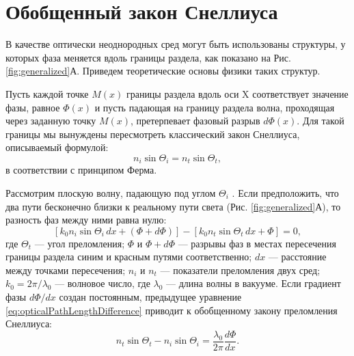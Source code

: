 \section{Обобщенный закон Снеллиуса}
В качестве оптически неоднородных сред могут быть использованы структуры, у которых фаза меняется вдоль границы раздела, как показано на Рис. \ref{fig:generalized}А. Приведем теоретические основы физики таких структур.

Пусть каждой точке $M(x)$ границы раздела вдоль оси $\mathrm{X}$ соответствует значение фазы, равное $\Phi(x)$ и пусть падающая на границу раздела волна, проходящая через заданную точку $M(x)$, претерпевает фазовый разрыв $d\Phi(x)$. Для такой границы мы вынуждены пересмотреть классический закон Снеллиуса, описываемый формулой:
\begin{equation}
    n_i \sin \Theta_i = n_t \sin \Theta_t,
\end{equation}
в соответствии с принципом Ферма.

Рассмотрим плоскую волну, падающую под углом $\Theta_i$ . Если предположить, что два пути бесконечно близки к реальному пути света (Рис. \ref{fig:generalized}А), то разность фаз между ними равна нулю:
\begin{equation}
    \label{eq:opticalPathLengthDifference}
    [k_0n_i\sin\Theta_i\, dx + (\Phi + d\Phi)] - [k_0n_t\sin\Theta_t\,dx + \Phi] = 0,
\end{equation}
где $\Theta_t$ --- угол преломления; $\Phi$ и $\Phi + d\Phi$ --- разрывы фаз в местах пересечения границы раздела синим и красным путями соответственно; $dx$ --- расстояние между точками пересечения; $n_i$ и $n_t$ --- показатели преломления двух сред; $k_0 = 2\pi/\lambda_0$ --- волновое число, где $\lambda_0$ --- длина волны в вакууме. Если градиент фазы $d\Phi/dx$ создан постоянным, предыдущее уравнение \eqref{eq:opticalPathLengthDifference} приводит к обобщенному закону преломления Снеллиуса\cite{generalized2011}:
\begin{equation}
    \label{eq:generalizedRefraction}
    n_t\sin\Theta_t - n_i \sin\Theta_i = \frac{\lambda_0}{2\pi}\frac{d\Phi}{dx}.
\end{equation}

